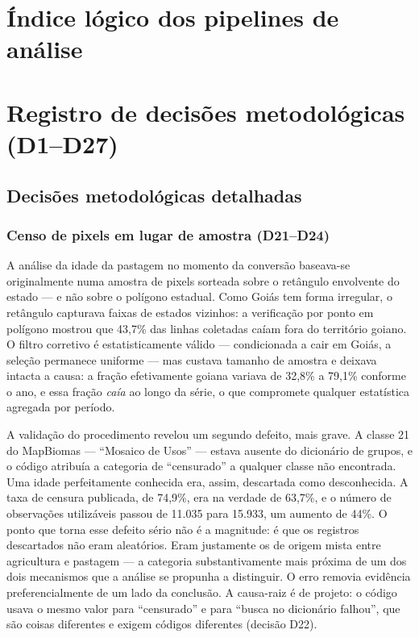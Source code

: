 \apendices

\chapter{Índice lógico dos pipelines de análise}
\label{ap:pipelines}


\chapter{Registro de decisões metodológicas (D1--D27)}
\label{ap:decisoes}


\section{Decisões metodológicas detalhadas}
\label{ap:decisoes-detalhe}

\subsection{Censo de pixels em lugar de amostra (D21--D24)}
\label{ap:d21}

A análise da idade da pastagem no momento da conversão baseava-se
originalmente numa amostra de pixels sorteada sobre o retângulo envolvente
do estado --- e não sobre o polígono estadual. Como Goiás tem forma
irregular, o retângulo capturava faixas de estados vizinhos: a verificação
por ponto em polígono mostrou que 43,7\% das linhas coletadas caíam fora do
território goiano. O filtro corretivo é estatisticamente válido --- condicionada
a cair em Goiás, a seleção permanece uniforme --- mas custava tamanho de
amostra e deixava intacta a causa: a fração efetivamente goiana variava de
32,8\% a 79,1\% conforme o ano, e essa fração \emph{caía} ao longo da série,
o que compromete qualquer estatística agregada por período.

A validação do procedimento revelou um segundo defeito, mais grave. A classe
21 do MapBiomas --- ``Mosaico de Usos'' --- estava ausente do dicionário de
grupos, e o código atribuía a categoria de ``censurado'' a qualquer classe
não encontrada. Uma idade perfeitamente conhecida era, assim, descartada
como desconhecida. A taxa de censura publicada, de 74,9\%, era na verdade de
63,7\%, e o número de observações utilizáveis passou de 11.035 para 15.933,
um aumento de 44\%. O ponto que torna esse defeito sério não é a magnitude:
é que os registros descartados não eram aleatórios. Eram justamente os de
origem mista entre agricultura e pastagem --- a categoria substantivamente
mais próxima de um dos dois mecanismos que a análise se propunha a
distinguir. O erro removia evidência preferencialmente de um lado da
conclusão. A causa-raiz é de projeto: o código usava o mesmo valor para
``censurado'' e para ``busca no dicionário falhou'', que são coisas
diferentes e exigem códigos diferentes (decisão D22).


